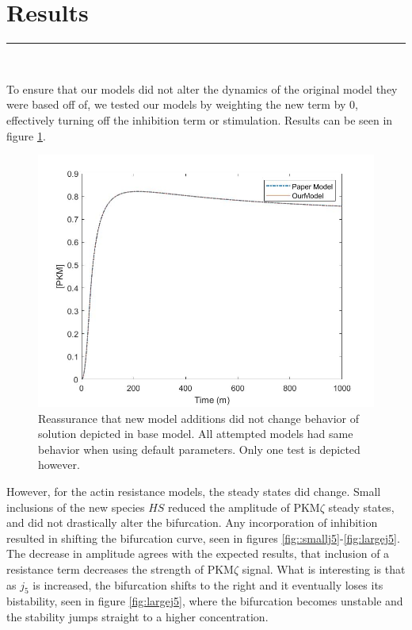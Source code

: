 \documentclass[12pt, a4paper]{article}
\newcommand{\blackbar}{{\nointerlineskip
{\rule{\linewidth}{1mm}}\\}}
\renewcommand{\d}{\textrm{d}}
\newcommand{\PK}{PKM$\zeta$ }
\begin{document}


\section*{Results}
\blackbar

To ensure that our models did not alter the dynamics of the original model they were based off of, we tested our models by weighting the new term by 0, effectively turning off the inhibition term or stimulation. Results can be seen in figure \ref{fig:aresame}.
\begin{figure}[H]
    \centering
    \includegraphics[scale = 0.4]{pics/toggleSwitch_Agrees_withPaper.jpg}
    \caption{Reassurance that new model additions did not change behavior of solution depicted in base model. All attempted models had same behavior when using default parameters. Only one test is depicted however.}
    \label{fig:aresame}
\end{figure}
However, for the actin resistance models, the steady states did change. Small inclusions of the new species $HS$ reduced the amplitude of \PK steady states, and did not drastically alter the bifurcation. Any incorporation of inhibition resulted in shifting the bifurcation curve, seen in figures \ref{fig::smallj5}-\ref{fig:largej5}. The decrease in amplitude agrees with the expected results, that inclusion of a resistance term decreases the strength of \PK signal. What is interesting is that as $j_5$ is increased, the bifurcation shifts to the right and it eventually loses its bistability, seen in figure \ref{fig:largej5}, where the bifurcation becomes unstable and the stability jumps straight to a higher concentration. 
\end{document}
